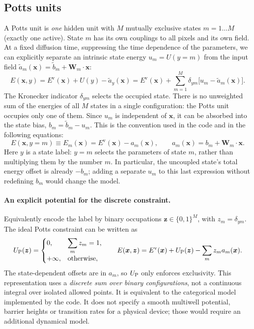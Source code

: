 \documentclass[11pt,a4paper]{article}
\newcommand{\vx}{\bm{x}}
\newcommand{\Ev}{E^{\mathrm{v}}}
\begin{document}
\subsection{Potts units}
A Potts unit is \emph{one} hidden unit with $M$ mutually exclusive states $m=1\dots M$ (exactly one active). State
$m$ has its own couplings to all pixels and its own field. At a fixed diffusion time, suppressing the time
dependence of the parameters, we can explicitly separate an intrinsic state energy $u_m=U(y=m)$ from the
input field $\widetilde a_m(\vx)=\widetilde b_m+\bm W_m\cdot\vx$:
\begin{equation*}
  E(\vx,y)=\Ev(\vx)+U(y)-\widetilde a_y(\vx)
  =\Ev(\vx)+\sum_{m=1}^M\delta_{ym}\big[u_m-\widetilde a_m(\vx)\big].
\end{equation*}
The Kronecker indicator $\delta_{ym}$ selects the occupied state. There is no unweighted sum of the energies
of all $M$ states in a single configuration: the Potts unit occupies only one of them. Since $u_m$ is independent
of $\vx$, it can be absorbed into the state bias, $b_m=\widetilde b_m-u_m$. This is the convention used in the
code and in the following equations:
\begin{equation*}
  E(\vx,y=m)\equiv E_m(\vx)=\Ev(\vx)-a_m(\vx),\qquad a_m(\vx)=b_m+\bm W_m\cdot\vx.
\end{equation*}
Here $y$ is a state label: $y=m$ selects the parameters of state $m$, rather than multiplying them by the number
$m$. In particular, the uncoupled state's total energy offset is already $-b_m$; adding a separate $u_m$ to
this last expression without redefining $b_m$ would change the model.

\paragraph{An explicit potential for the discrete constraint.} Equivalently encode the label by binary
occupations $\bm z\in\{0,1\}^M$, with $z_m=\delta_{ym}$. The ideal Potts constraint can be written as
\begin{equation*}
  U_{\rm P}(\bm z)=
  \begin{cases}
    0,&\displaystyle\sum_m z_m=1,\\
    +\infty,&\text{otherwise},
  \end{cases}
  \qquad
  E(\vx,\bm z)=\Ev(\vx)+U_{\rm P}(\bm z)-\sum_m z_m a_m(\vx).
\end{equation*}
The state-dependent offsets are in $a_m$, so $U_{\rm P}$ only enforces exclusivity. This representation uses a
\emph{discrete sum over binary configurations}, not a continuous integral over isolated allowed points. It is
equivalent to the categorical model implemented by the code. It does not specify a smooth multiwell potential,
barrier heights or transition rates for a physical device; those would require an additional dynamical model.
\end{document}
